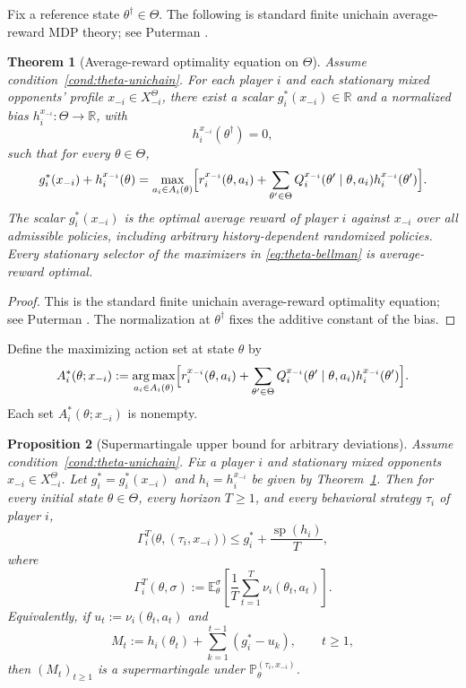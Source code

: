 \documentclass[11pt]{article}
\newtheorem{theorem}{Theorem}[section]
\newtheorem{proposition}[theorem]{Proposition}
\theoremstyle{definition}
\newcommand{\E}{\mathbb{E}}
\newcommand{\Prob}{\mathbb{P}}
\newcommand{\R}{\mathbb{R}}
\newcommand{\1}{\mathbf{1}}
\DeclareMathOperator{\spn}{sp}
\DeclareMathOperator{\argmax}{arg\,max}
\begin{document}
Fix a reference state $\theta^\dagger\in\Theta$. The following is standard finite unichain average-reward MDP theory; see Puterman \cite[Chapter~8]{Puterman1994}.

\begin{theorem}[Average-reward optimality equation on $\Theta$]\label{thm:theta-aroe}
Assume condition~\ref{cond:theta-unichain}. For each player $i$ and each stationary mixed opponents' profile $x_{-i}\in X_{-i}^\Theta$, there exist a scalar $g_i^*(x_{-i})\in\R$ and a normalized bias $h_i^{x_{-i}}:\Theta\to\R$, with
\[
h_i^{x_{-i}}(\theta^\dagger)=0,
\]
such that for every $\theta\in\Theta$,
\begin{equation}\label{eq:theta-bellman}
g_i^*(x_{-i})+h_i^{x_{-i}}(\theta)
=
\max_{a_i\in A_i(\theta)}\Bigl[r_i^{x_{-i}}(\theta,a_i)+\sum_{\theta'\in\Theta}Q_i^{x_{-i}}(\theta'\mid \theta,a_i)h_i^{x_{-i}}(\theta')\Bigr].
\end{equation}
The scalar $g_i^*(x_{-i})$ is the optimal average reward of player $i$ against $x_{-i}$ over all admissible policies, including arbitrary history-dependent randomized policies. Every stationary selector of the maximizers in \eqref{eq:theta-bellman} is average-reward optimal.
\end{theorem}

\begin{proof}
This is the standard finite unichain average-reward optimality equation; see Puterman \cite[Chapter~8]{Puterman1994}. The normalization at $\theta^\dagger$ fixes the additive constant of the bias.
\end{proof}

Define the maximizing action set at state $\theta$ by
\[
A_i^*(\theta;x_{-i})
:=
\argmax_{a_i\in A_i(\theta)}\Bigl[r_i^{x_{-i}}(\theta,a_i)+\sum_{\theta'\in\Theta}Q_i^{x_{-i}}(\theta'\mid \theta,a_i)h_i^{x_{-i}}(\theta')\Bigr].
\]
Each set $A_i^*(\theta;x_{-i})$ is nonempty.

\begin{proposition}[Supermartingale upper bound for arbitrary deviations]\label{prop:theta-supermartingale}
Assume condition~\ref{cond:theta-unichain}. Fix a player $i$ and stationary mixed opponents $x_{-i}\in X_{-i}^\Theta$. Let $g_i^*=g_i^*(x_{-i})$ and $h_i=h_i^{x_{-i}}$ be given by Theorem~\ref{thm:theta-aroe}. Then for every initial state $\theta\in\Theta$, every horizon $T\ge1$, and every behavioral strategy $\tau_i$ of player $i$,
\begin{equation}\label{eq:theta-dev-upper}
\Gamma_i^T\bigl(\theta,(\tau_i,x_{-i})\bigr)
\le g_i^*+\frac{\spn(h_i)}{T},
\end{equation}
where
\[
\Gamma_i^T(\theta,\sigma)
:=\E_\theta^\sigma\!\left[\frac1T\sum_{t=1}^{T}\nu_i(\theta_t,a_t)\right].
\]
Equivalently, if $u_t:=\nu_i(\theta_t,a_t)$ and
\[
M_t:=h_i(\theta_t)+\sum_{k=1}^{t-1}(g_i^*-u_k),
\qquad t\ge1,
\]
then $(M_t)_{t\ge1}$ is a supermartingale under $\Prob_\theta^{(\tau_i,x_{-i})}$.
\end{proposition}
\end{document}
